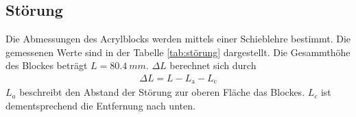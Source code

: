 \subsection{Störung}
Die Abmessungen des Acrylblocks werden mittels einer Schieblehre bestimmt. Die gemessenen Werte sind in der Tabelle \ref{tab:störung} dargestellt.
Die Gesammthöhe des Blockes beträgt $L = \SI{80,4}{mm}$. $\Delta L$ berechnet sich durch
\begin{align}
 \Delta L = L-L_{\text{a}}-L_{\text{c}}
 \label{eqn:L}
\end{align}
$L_a$ beschreibt den Abstand der Störung zur oberen Fläche das Blockes. $L_c$ ist dementsprechend die Entfernung nach unten.

\FloatBarrier

